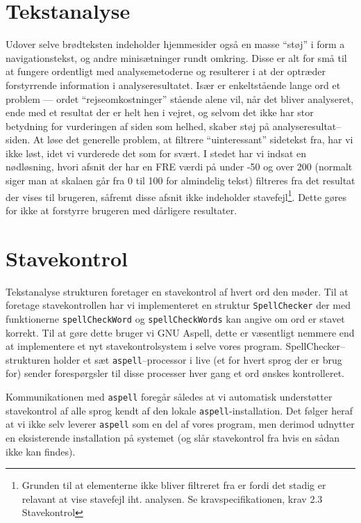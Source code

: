 \documentclass[a4paper,oneside]{memoir}
\begin{document}
\section{Tekstanalyse}
\label{tekstanalyse}


Udover selve brødteksten indeholder hjemmesider også en masse ``støj''
i form a navigationstekst, og andre minisætninger rundt omkring. Disse
er alt for små til at fungere ordentligt med analysemetoderne og
resulterer i at der optræder forstyrrende information i
analyseresultatet. Især er enkeltstående lange ord et problem ---
ordet ``rejseomkostninger'' stående alene vil, når det bliver
analyseret, ende med et resultat der er helt hen i vejret, og selvom
det ikke har stor betydning for vurderingen af siden som helhed,
skaber støj på analyseresultat--siden. At løse det generelle problem,
at filtrere ``uinteressant'' sidetekst fra, har vi ikke løst, idet vi
vurderede det som for svært. I stedet har vi indsat en nødløsning,
hvori afsnit der har en FRE værdi på under -50 og over 200 (normalt
siger man at skalaen går fra 0 til 100 for almindelig tekst) filtreres
fra det resultat der vises til brugeren, såfremt disse afsnit ikke
indeholder stavefejl\footnote{Grunden til at elementerne ikke bliver
  filtreret fra er fordi det stadig er relavant at vise stavefejl
  iht. analysen. Se kravspecifikationen, krav 2.3 Stavekontrol}. Dette
gøres for ikke at forstyrre brugeren med dårligere resultater.

\section{Stavekontrol}
\label{spellchecker}


Tekstanalyse strukturen foretager en stavekontrol af hvert ord den
møder. Til at foretage stavekontrollen har vi implementeret en
struktur \texttt{SpellChecker} der med funktionerne
\texttt{spellCheckWord} og \texttt{spellCheckWords} kan angive om ord
er stavet korrekt. Til at gøre dette bruger vi GNU Aspell, dette er
væsentligt nemmere end at implementere et nyt stavekontrolsystem i selve
vores program. SpellChecker--strukturen holder et sæt
\texttt{aspell}--processor i live (et for hvert sprog der er brug for)
sender forespørgsler til disse processer hver gang et ord ønskes
kontrolleret.

Kommunikationen med \texttt{aspell} foregår således at
vi automatisk understøtter stavekontrol af alle sprog kendt af den
lokale \texttt{aspell}-installation. Det følger heraf at vi ikke selv
leverer \texttt{aspell} som en del af vores program, men derimod
udnytter en eksisterende installation på systemet (og slår
stavekontrol fra hvis en sådan ikke kan findes).
\end{document}
